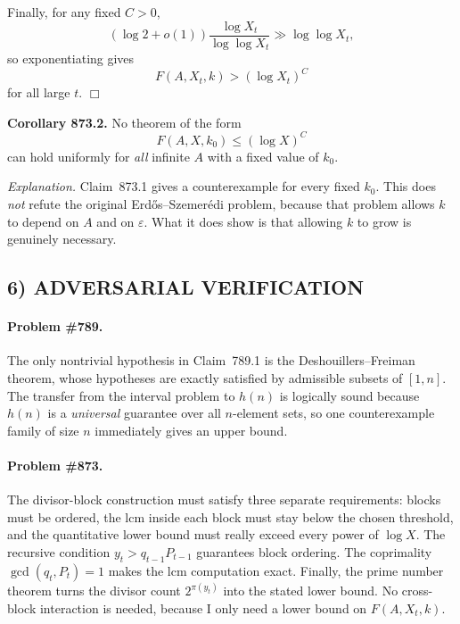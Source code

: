 Finally, for any fixed \(C>0\),
\[
  (\log 2 + o(1))\frac{\log X_t}{\log\log X_t} \gg \log\log X_t,
\]
so exponentiating gives
\[
  F(A,X_t,k) > (\log X_t)^C
\]
for all large \(t\).
\hfill\(\Box\)

\medskip
\noindent\textbf{Corollary 873.2.} No theorem of the form
\[
  F(A,X,k_0) \le (\log X)^C
\]
can hold uniformly for \emph{all} infinite \(A\) with a fixed value of \(k_0\).

\medskip
\noindent\emph{Explanation.}
Claim~873.1 gives a counterexample for every fixed \(k_0\). This does \emph{not} refute the original Erd\H{o}s--Szemer\'edi problem, because that problem allows \(k\) to depend on \(A\) and on \(\varepsilon\). What it does show is that allowing \(k\) to grow is genuinely necessary.

\subsection*{6) ADVERSARIAL VERIFICATION}

\paragraph{Problem \#789.}
The only nontrivial hypothesis in Claim~789.1 is the Deshouillers--Freiman theorem, whose hypotheses are exactly satisfied by admissible subsets of \([1,n]\). The transfer from the interval problem to \(h(n)\) is logically sound because \(h(n)\) is a \emph{universal} guarantee over all \(n\)-element sets, so one counterexample family of size \(n\) immediately gives an upper bound.

\paragraph{Problem \#873.}
The divisor-block construction must satisfy three separate requirements: blocks must be ordered, the lcm inside each block must stay below the chosen threshold, and the quantitative lower bound must really exceed every power of \(\log X\). The recursive condition \(y_t>q_{t-1}P_{t-1}\) guarantees block ordering. The coprimality \(\gcd(q_t,P_t)=1\) makes the lcm computation exact. Finally, the prime number theorem turns the divisor count \(2^{\pi(y_t)}\) into the stated lower bound. No cross-block interaction is needed, because I only need a lower bound on \(F(A,X_t,k)\).

